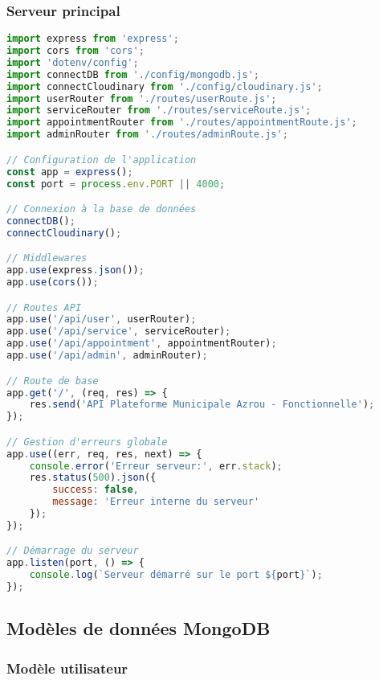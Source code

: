 \subsubsection{Serveur principal}

\begin{lstlisting}[language=JavaScript, caption=server.js principal]
import express from 'express';
import cors from 'cors';
import 'dotenv/config';
import connectDB from './config/mongodb.js';
import connectCloudinary from './config/cloudinary.js';
import userRouter from './routes/userRoute.js';
import serviceRouter from './routes/serviceRoute.js';
import appointmentRouter from './routes/appointmentRoute.js';
import adminRouter from './routes/adminRoute.js';

// Configuration de l'application
const app = express();
const port = process.env.PORT || 4000;

// Connexion à la base de données
connectDB();
connectCloudinary();

// Middlewares
app.use(express.json());
app.use(cors());

// Routes API
app.use('/api/user', userRouter);
app.use('/api/service', serviceRouter);
app.use('/api/appointment', appointmentRouter);
app.use('/api/admin', adminRouter);

// Route de base
app.get('/', (req, res) => {
    res.send('API Plateforme Municipale Azrou - Fonctionnelle');
});

// Gestion d'erreurs globale
app.use((err, req, res, next) => {
    console.error('Erreur serveur:', err.stack);
    res.status(500).json({
        success: false,
        message: 'Erreur interne du serveur'
    });
});

// Démarrage du serveur
app.listen(port, () => {
    console.log(`Serveur démarré sur le port ${port}`);
});
\end{lstlisting}

\subsection{Modèles de données MongoDB}

\subsubsection{Modèle utilisateur}

